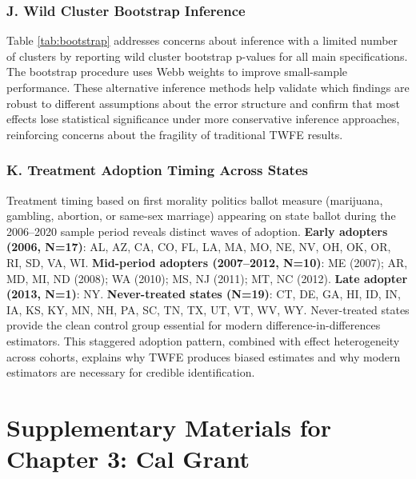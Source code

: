 \documentclass[12pt,letterpaper,oneside]{book}
\newcommand{\basepath}{g:/My Drive/Grad School}
\newcommand{\basepath}{basepath}
\begin{document}

\label{tab:variables}

\subsection*{J. Wild Cluster Bootstrap Inference}

Table \ref{tab:bootstrap} addresses concerns about inference with a limited number of clusters by reporting wild cluster bootstrap p-values for all main specifications. The bootstrap procedure uses Webb weights to improve small-sample performance. These alternative inference methods help validate which findings are robust to different assumptions about the error structure and confirm that most effects lose statistical significance under more conservative inference approaches, reinforcing concerns about the fragility of traditional TWFE results.


\label{tab:bootstrap}

\subsection*{K. Treatment Adoption Timing Across States}

Treatment timing based on first morality politics ballot measure (marijuana, gambling, abortion, or same-sex marriage) appearing on state ballot during the 2006--2020 sample period reveals distinct waves of adoption. \textbf{Early adopters (2006, N=17)}: AL, AZ, CA, CO, FL, LA, MA, MO, NE, NV, OH, OK, OR, RI, SD, VA, WI. \textbf{Mid-period adopters (2007--2012, N=10)}: ME (2007); AR, MD, MI, ND (2008); WA (2010); MS, NJ (2011); MT, NC (2012). \textbf{Late adopter (2013, N=1)}: NY. \textbf{Never-treated states (N=19)}: CT, DE, GA, HI, ID, IN, IA, KS, KY, MN, NH, PA, SC, TN, TX, UT, VT, WV, WY. Never-treated states provide the clean control group essential for modern difference-in-differences estimators. This staggered adoption pattern, combined with effect heterogeneity across cohorts, explains why TWFE produces biased estimates and why modern estimators are necessary for credible identification.

\chapter{Supplementary Materials for Chapter 3: Cal Grant}
\end{document}
